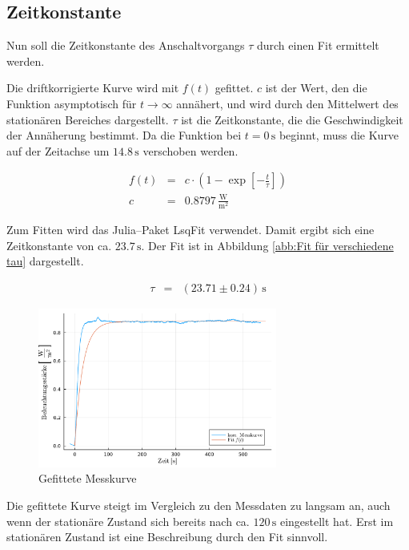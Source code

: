 \documentclass[12pt,a4paper]{scrartcl}
\numberwithin{equation}{section} %
\newcommand{\code}[1]{\textsf{#1}}
\begin{document}
\subsection{Zeitkonstante}
\label{Zeitkonstante}
Nun soll die Zeitkonstante des Anschaltvorgangs $\tau$ durch einen Fit ermittelt werden.

Die driftkorrigierte Kurve wird mit $f(t)$ gefittet. $c$ ist der Wert, den die Funktion asymptotisch für $t \rightarrow \infty$ annähert, und wird durch den Mittelwert des stationären Bereiches dargestellt. $\tau $ ist die Zeitkonstante, die die Geschwindigkeit der Annäherung bestimmt. Da die Funktion bei $t=0\mathrm{\,s}$ beginnt, muss die Kurve auf der Zeitachse um $14.8\mathrm{\,s}$ verschoben werden.

\begin{eqnarray}
	f(t) &=& c \cdot \left(
	1 - \exp[-\frac{t}{\tau}]
	\right)
	\label{eq:Drift Fit} \\
	c &=& 0.8797 \mathrm{\,\frac{W}{m^2}}
\end{eqnarray}

\noindent
Zum Fitten wird das \code{Julia}--Paket \code{LsqFit} \cite{Julia:LsqFit} verwendet. Damit ergibt sich eine Zeitkonstante von ca. $23.7\mathrm{\,s}$. Der Fit ist in Abbildung \ref{abb:Fit für verschiedene tau} dargestellt.

\begin{eqnarray}
	\tau &=& (23.71 \pm 0.24)\mathrm{\,s}
\end{eqnarray}

\begin{figure}[h!]
	\centering
	\includegraphics[width=0.7\textwidth]{../media/B1.1/ZeitkonstJulia.pdf}
	\caption{Gefittete Messkurve}
	\label{abb:Gefittete Messkurve}
\end{figure}

\noindent
Die gefittete Kurve steigt im Vergleich zu den Messdaten zu langsam an, auch wenn der stationäre Zustand sich bereits nach ca. $120\mathrm{\,s}$ eingestellt hat. Erst im stationären Zustand ist eine Beschreibung durch den Fit sinnvoll.
\end{document}
